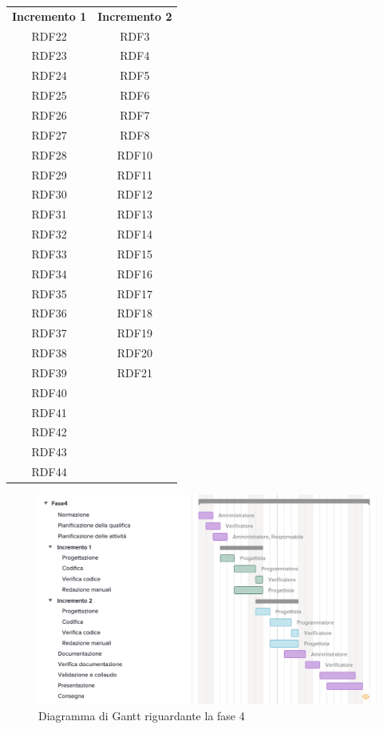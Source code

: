 \begin{tabularx}{\textwidth}{| c | c | }
	\rowcolor{LightBlue}
	\color{white}\bfseries Incremento 1 & 
	\color{white}\bfseries Incremento 2  \\[0.25cm]
	RDF22 & RDF3 \\ 
	RDF23 & RDF4 \\ 
	RDF24 & RDF5 \\ 
	RDF25 & RDF6 \\ 
	RDF26 & RDF7 \\ 
	RDF27 & RDF8 \\ 
	RDF28 & RDF10 \\ 
	RDF29 & RDF11 \\ 
	RDF30 & RDF12 \\ 
	RDF31 & RDF13 \\ 
	RDF32 & RDF14 \\ 
	RDF33 & RDF15 \\ 
	RDF34 & RDF16 \\ 
	RDF35 & RDF17 \\ 
	RDF36 & RDF18 \\
	RDF37 & RDF19\\
	RDF38 & RDF20 \\
	RDF39 & RDF21 \\
	RDF40 &  \\
	RDF41 &  \\
	RDF42 &  \\
	RDF43 &  \\
	RDF44 &  \\
		 \hline
\end{tabularx}

\begin{figure}[h]
	\centering
	\includegraphics[scale=0.70]{images/fase4.png}
	\caption{Diagramma di Gantt riguardante la fase 4}
\end{figure}